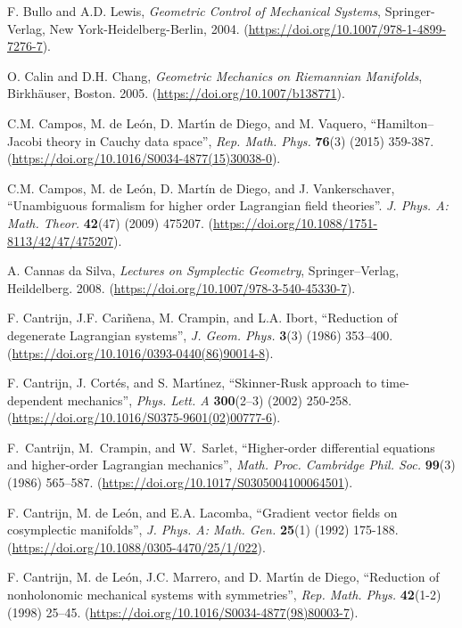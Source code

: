 \documentclass[12pt]{report}
\begin{document}
\begin{thebibliography}{999}
F. Bullo and A.D. Lewis,
{\it Geometric Control of Mechanical Systems},
Springer-Verlag, New York-Heidelberg-Berlin, 2004.
(\url{https://doi.org/10.1007/978-1-4899-7276-7}).

O. Calin and D.H. Chang,
{\it Geometric Mechanics on Riemannian Manifolds},
Birkh\"auser, Boston. 2005.
(\url{https://doi.org/10.1007/b138771}).

C.M. Campos, M. de Le\'{o}n, D. Mart\'{\i}n de Diego, and M. Vaquero,
``Hamilton--Jacobi theory in Cauchy data space'',
{\sl Rep. Math. Phys.} {\bf 76}(3) (2015) 359-387.
(\url{https://doi.org/10.1016/S0034-4877(15)30038-0}).

C.M. Campos, M. de Le\'on, D. Mart\'in de Diego, and J. Vankerschaver, 
``Unambiguous formalism for higher order Lagrangian field theories''. 
{\sl J. Phys. A: Math. Theor.} {\bf 42}(47) (2009) 475207.
(\url{https://doi.org/10.1088/1751-8113/42/47/475207}).

A. Cannas da Silva,
{\it Lectures on Symplectic Geometry},
 Springer--Verlag, Heildelberg. 2008.
(\url{https://doi.org/10.1007/978-3-540-45330-7}).

{\rm F. Cantrijn, J.F. Cari\~nena, M. Crampin, and  L.A. Ibort},
``Reduction of degenerate Lagrangian systems'',
{\sl J. Geom. Phys.} {\bf 3}(3) (1986) 353--400.
(\url{https://doi.org/10.1016/0393-0440(86)90014-8}).

{\rm  F. Cantrijn, J. Cort\'es, and S. Mart\'\i nez}, 
``Skinner-Rusk approach to time-dependent mechanics'', 
{\sl Phys. Lett. A} {\bf 300}(2--3) (2002) 250-258.
(\url{https://doi.org/10.1016/S0375-9601(02)00777-6}).

F.~{Cantrijn}, M.~{Crampin}, and W.~{Sarlet}, 
``Higher-order differential equations and higher-order {Lagrangian} mechanics'', 
\textsl{Math. Proc. Cambridge Phil. Soc.} \textbf{99}(3)  (1986) 565--587.
(\url{https://doi.org/10.1017/S0305004100064501}).

F. Cantrijn, M. de Le\'on,  and E.A. Lacomba, 
``Gradient vector fields on cosymplectic manifolds'',
 {\sl J. Phys. A: Math. Gen.} {\bf 25}(1) (1992) 175-188.
(\url{https://doi.org/10.1088/0305-4470/25/1/022}).

F. Cantrijn, M. de Le\'on, J.C. Marrero, and D. Mart\'\i n de Diego,
``Reduction of nonholonomic mechanical systems with symmetries'',
{\sl Rep. Math. Phys.} {\bf 42}(1-2) (1998) 25--45.
(\url{https://doi.org/10.1016/S0034-4877(98)80003-7}).


\end{thebibliography}
\end{document}
